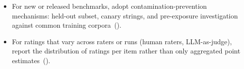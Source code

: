 \begin{itemize}[label={},leftmargin=*]
    \item \iconS {} For new or released benchmarks, adopt contamination-prevention mechanisms: held-out subset, canary strings, and pre-exposure investigation against common training corpora~().
    \item \iconS {} For ratings that vary across raters or runs (human raters, LLM-as-judge), report the distribution of ratings per item rather than only aggregated point estimates~().
\end{itemize}

